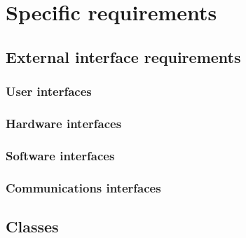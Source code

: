 \section{Specific requirements}
\vp


\subsection{External interface requirements}

\subsubsection{User interfaces}

\subsubsection{Hardware interfaces}

\subsubsection{Software interfaces}

\subsubsection{Communications interfaces}


\subsection{Classes}
\lstset{language=C++} %

\subsubsection{\code{\cs/}}

\codes{}

\codes{}

\subsubsection{}

